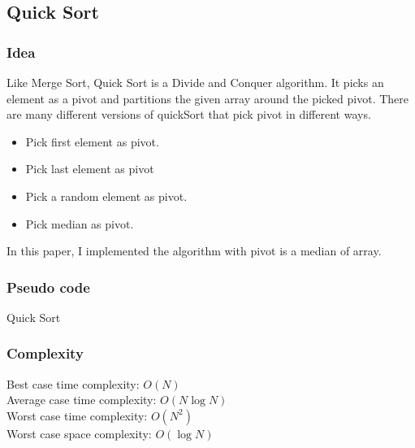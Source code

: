 \documentclass[11pt,a4paper]{article}
\begin{document}
\subsection{Quick Sort}
\subsubsection*{Idea}
Like Merge Sort, Quick Sort is a Divide and Conquer algorithm. 
It picks an element as a pivot and partitions the given array around the picked pivot. 
There are many different versions of quickSort that pick pivot in different ways. 

\begin{itemize}
  \item Pick first element as pivot.
  \item Pick last element as pivot
  \item Pick a random element as pivot.
  \item Pick median as pivot.
\end{itemize}

In this paper, I implemented the algorithm with pivot is a median of array.

\subsubsection*{Pseudo code}
\begin{algorithm2e}
  \SetAlgoLined
  \caption{Quick Sort}
\end{algorithm2e}

\subsubsection*{Complexity}
Best case time complexity: $O(N)$ \\
Average case time complexity: $O(N \log N)$\\
Worst case time complexity: $O(N^2)$ \\
Worst case space complexity: $O(\log N)$
\end{document}
